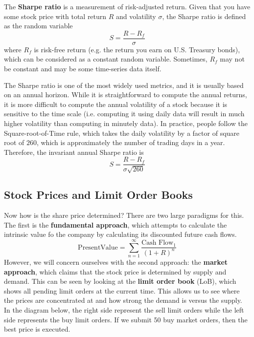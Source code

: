 \documentclass{article}
\begin{document}
    \begin{definition}
      The \textbf{Sharpe ratio} is a measurement of risk-adjusted return. Given that you have some stock price with total return $R$ and volatility $\sigma$, the Sharpe ratio is defined as the random variable
      \[S = \frac{R - R_f}{\sigma}\]
      where $R_f$ is risk-free return (e.g. the return you earn on U.S. Treasury bonds), which can be considered as a constant random variable. Sometimes, $R_f$ may not be constant and may be some time-series data itself. 
    \end{definition}

    The Sharpe ratio is one of the most widely used metrics, and it is usually based on an annual horizon. While it is straightforward to compute the annual returns, it is more difficult to compute the annual volatility of a stock because it is sensitive to the time scale (i.e. computing it using daily data will result in much higher volatility than computing in minutely data). In practice, people follow the Square-root-of-Time rule, which takes the daily volatility by a factor of square root of $260$, which is approximately the number of trading days in a year. Therefore, the invariant annual Sharpe ratio is 
    \begin{equation}
      S = \frac{R - R_f}{\sigma \sqrt{260}}
    \end{equation}

  \subsection{Stock Prices and Limit Order Books}

    Now how is the share price determined? There are two large paradigms for this. The first is the \textbf{fundamental approach}, which attempts to calculate the intrinsic value fo the company by calculating its discounted future cash flows. 
    \begin{equation}
      \mathrm{Present Value} = \sum_{n=1}^\infty \frac{\text{Cash Flow}_1}{(1 + R)^n}
    \end{equation}
    However, we will concern ourselves with the second approach: the \textbf{market approach}, which claims that the stock price is determined by supply and demand. This can be seen by looking at the \textbf{limit order book} (LoB), which shows all pending limit orders at the current time. This allows us to see where the prices are concentrated at and how strong the demand is versus the supply. In the diagram below, the right side represent the sell limit orders while the left side represents the buy limit orders. If we submit 50 buy market orders, then the best price is executed. 
\end{document}

